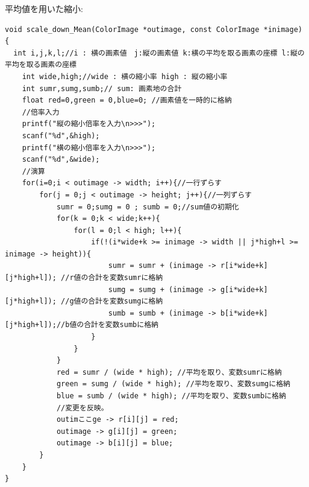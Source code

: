 \documentclass[a4paper,titlepage,11pt]{ltjsarticle}
\begin{document}
平均値を用いた縮小:
\begin{lstlisting}
void scale_down_Mean(ColorImage *outimage, const ColorImage *inimage)
{
  int i,j,k,l;//i : 横の画素値　j:縦の画素値 k:横の平均を取る画素の座標 l:縦の平均を取る画素の座標
	int wide,high;//wide : 横の縮小率 high : 縦の縮小率
	int sumr,sumg,sumb;// sum: 画素地の合計
	float red=0,green = 0,blue=0; //画素値を一時的に格納
	//倍率入力
	printf("縦の縮小倍率を入力\n>>>");
	scanf("%d",&high);
	printf("横の縮小倍率を入力\n>>>");
	scanf("%d",&wide);
	//演算
	for(i=0;i < outimage -> width; i++){//一行ずらす
		for(j = 0;j < outimage -> height; j++){//一列ずらす
			sumr = 0;sumg = 0 ; sumb = 0;//sum値の初期化
			for(k = 0;k < wide;k++){
				for(l = 0;l < high; l++){
					if(!(i*wide+k >= inimage -> width || j*high+l >= inimage -> height)){
						sumr = sumr + (inimage -> r[i*wide+k][j*high+l]); //r値の合計を変数sumrに格納
						sumg = sumg + (inimage -> g[i*wide+k][j*high+l]); //g値の合計を変数sumgに格納
						sumb = sumb + (inimage -> b[i*wide+k][j*high+l]);//b値の合計を変数sumbに格納
					}
				}
			}
			red = sumr / (wide * high); //平均を取り、変数sumrに格納
			green = sumg / (wide * high); //平均を取り、変数sumgに格納
			blue = sumb / (wide * high); //平均を取り、変数sumbに格納
			//変更を反映。
			outimここge -> r[i][j] = red;
			outimage -> g[i][j] = green;
			outimage -> b[i][j] = blue;
		}
	}
}
\end{lstlisting}
\end{document}
